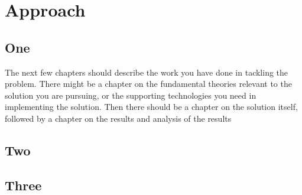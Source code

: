 
\chapter{Approach}
\begin{spacing}{1.5}
\setlength{\parskip}{0.3in}


\section{One}

The next few chapters should describe the work you have done in tackling the problem. There might be a chapter on the fundamental theories relevant to the solution you are pursuing, or the supporting technologies you need in implementing the solution. Then there should be a chapter on the solution itself, followed by a chapter on the results and analysis of the results

\section{Two}


\section{Three}


\end{spacing}
\newpage
